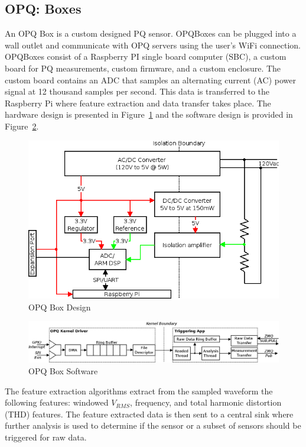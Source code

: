 \subsection{OPQ: Boxes}\label{subsec:opq:-boxes}
An OPQ Box is a custom designed PQ sensor. OPQBoxes can be plugged into a wall outlet and communicate with OPQ servers using the user's WiFi connection. OPQBoxes consist of a Raspberry PI single board computer (SBC), a custom board for PQ measurements, custom firmware, and a custom enclosure. The custom board contains an ADC that samples an alternating current (AC) power signal at 12 thousand samples per second. This data is transferred to the Raspberry Pi where feature extraction and data transfer takes place. The hardware design is presented in Figure~\ref{fig:opq-box-design} and the software design is provided in Figure~\ref{fig:opq-box-software}.

\begin{figure}
	\centering
	\includegraphics[width=.75\linewidth]{figures/opqbox_diagram.png}
	\caption{OPQ Box Design}\label{fig:opq-box-design}
\end{figure}

\begin{figure}
	\centering
	\includegraphics[width=.75\linewidth]{figures/opqbox_software.png}
	\caption{OPQ Box Software}\label{fig:opq-box-software}
\end{figure}

The feature extraction algorithms extract from the sampled waveform the following features: windowed $V_{RMS}$, frequency, and total harmonic distortion (THD) features. The feature extracted data is then sent to a central sink where further analysis is used to determine if the sensor or a subset of sensors should be triggered for raw data.

